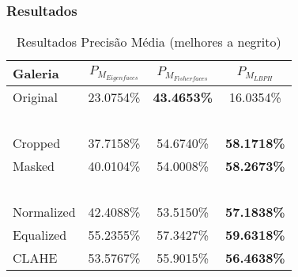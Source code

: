 \subsubsection{Resultados}
\begin{center}
\begin{table}
	\begin{center}
    \caption{Resultados Precisão Média (melhores a negrito)}
    \begin{tabular}{l|ccc}
    Galeria    & $P_{M_{Eigenfaces}}$ & $P_{M_{Fisherfaces}}$ & $P_{M_{LBPH}}$ \\ 
    \hline\hline
    Original   & 23.0754\%          & \textbf{43.4653\%}           & 16.0354\%    \\
    ~ \\
    Cropped    & 37.7158\%          & 54.6740\%           & \textbf{58.1718\%}    \\
    Masked     & 40.0104\%          & 54.0008\%           & \textbf{58.2673\%}    \\
    ~ \\
    Normalized & 42.4088\%          & 53.5150\%           & \textbf{57.1838\%}    \\
    Equalized  & 55.2355\%          & 57.3427\%           & \textbf{59.6318\%}    \\
    CLAHE      & 53.5767\%          & 55.9015\%           & \textbf{56.4638\%}    \\
    \hline\hline
    \end{tabular}
   	\label{tab:resultadosprecicao}
   	\end{center}
\end{table}
\end{center}
